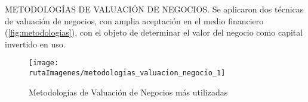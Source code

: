 

\textcolor{secundario}{METODOLOG\'IAS DE VALUACI\'ON DE NEGOCIOS}. Se aplicaron dos t\'ecnicas de valuaci\'on de negocios, con amplia aceptaci\'on en el medio financiero (\autoref{fig:metodologias}), con el objeto de determinar el valor del negocio como capital invertido en uso.\\

\begin{figure}[H]
\centering
\caption{Metodolog\'ias de Valuaci\'on de Negocios m\'as utilizadas\label{fig:metodologias}}
\texttt{[image: \\rutaImagenes/metodologias\_valuacion\_negocio\_1]}\\

\end{figure}
